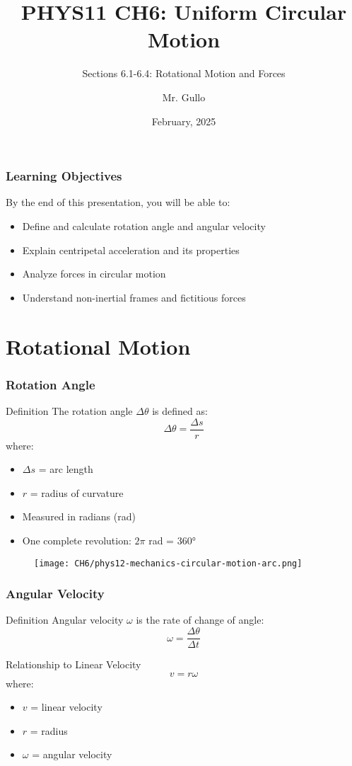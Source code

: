 \documentclass{beamer}
\title[Circular Motion]{PHYS11 CH6: Uniform Circular Motion}
\subtitle{Sections 6.1-6.4: Rotational Motion and Forces}
\author[Mr. Gullo]{Mr. Gullo}
\date[Feb 2025]{February, 2025}
\institute{Physics Department}
\begin{document}
\frame{\titlepage}

\begin{frame}
\frametitle{Learning Objectives}
\begin{block}{By the end of this presentation, you will be able to:}
\begin{itemize}
\item Define and calculate rotation angle and angular velocity
\item Explain centripetal acceleration and its properties
\item Analyze forces in circular motion
\item Understand non-inertial frames and fictitious forces
\end{itemize}
\end{block}
\end{frame}

\section{Rotational Motion}

\begin{frame}
\frametitle{Rotation Angle}
\begin{block}{Definition}
The rotation angle $\Delta\theta$ is defined as:
\[ \Delta\theta = \frac{\Delta s}{r} \]
where:
\begin{itemize}
\item $\Delta s$ = arc length
\item $r$ = radius of curvature
\end{itemize}
\end{block}
\begin{itemize}
\item Measured in radians (rad)
\item One complete revolution: $2\pi$ rad = 360°
\end{itemize}
\end{frame}

\begin{frame}
\begin{figure}
    \centering
    \texttt{[image: CH6/phys12-mechanics-circular-motion-arc.png]}
\end{figure}
\end{frame}

\begin{frame}
\frametitle{Angular Velocity}
\begin{block}{Definition}
Angular velocity $\omega$ is the rate of change of angle:
\[ \omega = \frac{\Delta\theta}{\Delta t} \]
\end{block}
\begin{block}{Relationship to Linear Velocity}
\[ v = r\omega \]
where:
\begin{itemize}
\item $v$ = linear velocity
\item $r$ = radius
\item $\omega$ = angular velocity
\end{itemize}
\end{block}
\end{frame}
\end{document}
